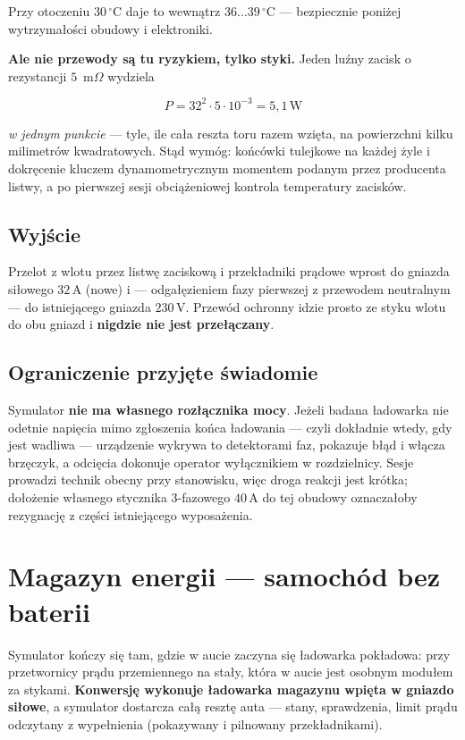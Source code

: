 \documentclass[a4paper,11pt]{article}
\newcommand{\volt}{\,\mathrm{V}}
\newcommand{\amp}{\,\mathrm{A}}
\newcommand{\watt}{\,\mathrm{W}}
\begin{document}
Przy otoczeniu $30\,^\circ$C daje to wewnątrz $36\ldots39\,^\circ$C --- bezpiecznie
poniżej wytrzymałości obudowy i elektroniki.

\textbf{Ale nie przewody są tu ryzykiem, tylko styki.} Jeden luźny zacisk
o rezystancji $5$~m$\Omega$ wydziela

\[
P = 32^2\cdot5\cdot10^{-3}=5{,}1\watt
\]

\emph{w jednym punkcie} --- tyle, ile cała reszta toru razem wzięta, na powierzchni
kilku milimetrów kwadratowych. Stąd wymóg: końcówki tulejkowe na każdej żyle
i dokręcenie kluczem dynamometrycznym momentem podanym przez producenta listwy,
a po pierwszej sesji obciążeniowej kontrola temperatury zacisków.

\subsection{Wyjście}

Przelot z wlotu przez listwę zaciskową i przekładniki prądowe wprost do gniazda
siłowego $32\amp$ (nowe) i --- odgałęzieniem fazy pierwszej z przewodem
neutralnym --- do istniejącego gniazda $230\volt$. Przewód ochronny idzie prosto
ze styku wlotu do obu gniazd i \textbf{nigdzie nie jest przełączany}.

\subsection{Ograniczenie przyjęte świadomie}

Symulator \textbf{nie ma własnego rozłącznika mocy}. Jeżeli badana ładowarka nie
odetnie napięcia mimo zgłoszenia końca ładowania --- czyli dokładnie wtedy, gdy
jest wadliwa --- urządzenie wykrywa to detektorami faz, pokazuje błąd i włącza
brzęczyk, a odcięcia dokonuje operator wyłącznikiem w rozdzielnicy. Sesje prowadzi
technik obecny przy stanowisku, więc droga reakcji jest krótka; dołożenie własnego
stycznika 3-fazowego $40\amp$ do tej obudowy oznaczałoby rezygnację z części
istniejącego wyposażenia.

\section{Magazyn energii --- samochód bez baterii}

Symulator kończy się tam, gdzie w aucie zaczyna się ładowarka pokładowa: przy
przetwornicy prądu przemiennego na stały, która w aucie jest osobnym modułem za
stykami. \textbf{Konwersję wykonuje ładowarka magazynu wpięta w gniazdo siłowe},
a symulator dostarcza całą resztę auta --- stany, sprawdzenia, limit prądu
odczytany z wypełnienia (pokazywany i pilnowany przekładnikami).
\end{document}
